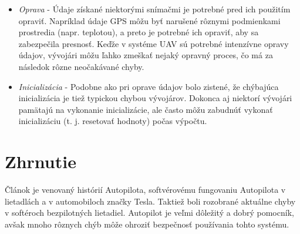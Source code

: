 \documentclass[10pt,twoside,slovak,a4paper]{article}
\begin{document}
\begin{itemize}
\item \emph{Oprava} - Údaje získané niektorými snímačmi je potrebné pred ich použitím opraviť. Napríklad údaje GPS môžu byť narušené rôznymi podmienkami prostredia (napr. teplotou), a preto je potrebné ich opraviť, aby sa zabezpečila presnosť. Keďže v systéme UAV sú potrebné intenzívne opravy údajov, vývojári môžu ľahko zmeškať nejaký opravný proces, čo má za následok rôzne neočakávané chyby.
\item \emph{Inicializácia} - Podobne ako pri oprave údajov bolo zistené, že chýbajúca inicializácia je tiež typickou chybou vývojárov. Dokonca aj niektorí vývojári pamätajú na vykonanie inicializácie, ale často môžu zabudnúť vykonať inicializáciu (t. j. resetovať hodnoty) počas výpočtu.\cite{chybyautopilot}
\end{itemize} 

\section{Zhrnutie}

Článok je venovaný histórií Autopilota, softvérovému fungovaniu Autopilota v lietadlách a v automobiloch značky Tesla. Taktiež boli rozobrané aktuálne chyby v softéroch bezpilotných lietadiel. Autopilot je veľmi dôležitý a dobrý pomocník, avšak mnoho rôznych chýb môže ohroziť bezpečnosť používania tohto systému.


 
\end{document}
